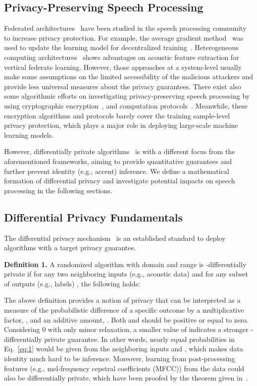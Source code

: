 \documentclass[a4paper]{article}
\begin{document}
\subsection{Privacy-Preserving Speech Processing}
Federated architectures~\cite{leroy2019federated,  dimitriadis2020federated, yang2020decentralizing} have been studied in the speech processing community to increase privacy protection. For example, the average gradient method~\cite{dimitriadis2020federated} was used to update the learning model for decentralized training~\cite{qi2020submodular}. Heterogeneous computing architectures~\cite{yang2020decentralizing, chen2021federated} shows advantages on acoustic feature extraction for vertical federate learning. However, those approaches at a system-level usually make some assumptions on the limited accessibility of the malicious attackers and provide less universal measures about the privacy guarantees. There exist also some algorithmic efforts on investigating privacy-preserving speech processing by using cryptographic encryption~\cite{glackin2017privacy, brasser2018voiceguard}, and computation protocols~\cite{pathak2012privacy}. Meanwhile, these encryption algorithms and protocols barely cover the training sample-level privacy protection, which plays a major role in deploying large-scale machine learning models.

However, differentially private algorithms~\cite{abadi2016deep, dwork2010boosting} is with a different focus from the aforementioned frameworks, aiming to provide quantitative guarantees and further prevent identity (e.g., accent) inference. We define a mathematical formation of differential privacy and investigate potential impacts on speech processing in the following sections.


\subsection{Differential Privacy Fundamentals}
The differential privacy mechanism~\cite{dwork2008differential} is an established standard to deploy algorithms with a target privacy guarantee.

\textbf{Definition 1.} A randomized algorithm  with domain  and range  is -differentially private if for any two neighboring inputs (e.g., acoustic data)  and for any subset of outputs (e.g., labels) , the following holds:

The above definition provides a notion of privacy that can be interpreted as a measure of the probabilistic difference of a specific outcome by a multiplicative factor, , and an additive amount, . Both  and
 should be positive or equal to zero. Considering  0 with only minor relaxation, a smaller value of  indicates a stronger -differentially private guarantee. In other words, nearly equal probabilities in Eq.~\ref{eq:1} would be given from the neighboring inputs  and , which makes data identity much hard to be inference. Moreover, learning from post-processing features (e.g., mel-frequency cepstral coefficients (MFCC)) from the data could also be differentially private, which have been proofed by the theorem given in~\cite{dwork2008differential}.
\end{document}

